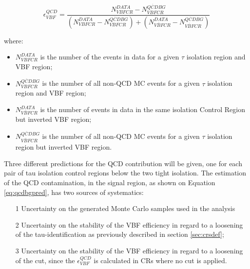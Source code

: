 \begin{equation}
\epsilon^{QCD}_{VBF} = \frac {N^{DATA}_{VBF CR} - N^{\overline{QCD} BG}_{VBFCR}}{\left( N^{DATA}_{VBFCR} - N^{\overline{QCD} BG}_{VBFCR} \right) + \left( N^{DATA}_{\overline{VBF}CR} - N^{\overline{QCD} BG}_{\overline{VBF}CR} \right) }
\label{eq:vbfeff}
\end{equation}

where:

\begin{itemize}
\item $N^{DATA}_{VBF CR}$ is the number of the events in data for a given $ \tau $ isolation region and VBF region;
\item $N^{\overline{QCD} BG}_{VBFCR}$ is the number of all non-QCD MC events for a given $ \tau $ isolation region and VBF region;
\item $N^{DATA}_{\overline{VBF}CR}$ is the number of events in data in the same isolation Control Region but inverted VBF region;
\item $N^{\overline{QCD} BG}_{\overline{VBF}CR}$ is the number of all non-QCD MC events for a given $ \tau $ isolation region but inverted VBF region.
\end{itemize}

Three different predictions for the QCD contribution will be given, one for each pair of tau isolation control regions below the two tight isolation. The estimation of the QCD contamination, in the signal region,  as shown on Equation \ref{eq:qcdbgpred}, has two sources of systematics:  

\begin{itemize}
\item[1]Uncertainty on the generated Monte Carlo samples used in the analysis
\item[2]  Uncertainty on the stability of the VBF efficiency in regard to a loosening of the tau-identification as previously described in section \ref{sec:crsdef};
\item[3] Uncertainty on the stability of the VBF efficiency in regard to a loosening of the \met cut, since the $\epsilon^{QCD}_{VBF}$ is calculated in CRs where no \met cut is applied.
\end{itemize}

